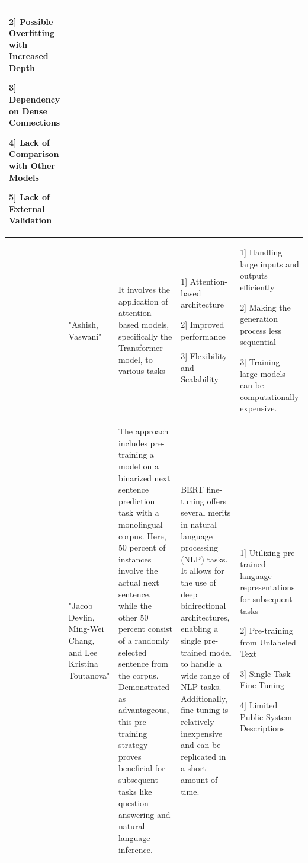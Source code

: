 \documentclass[fleqn,10pt]{thescipub} %
\begin{document}
\begin{table}
\begin{center}
\begin{tabular}{ |p{1cm}|p{2cm}|p{4cm}|p{4cm}|p{4cm}| }
2] Possible Overfitting with Increased Depth

3] Dependency on Dense Connections

4] Lack of Comparison with Other Models

5] Lack of External Validation \\
\hline
[21]  & "Ashish, Vaswani" & It involves the application of attention-based models, specifically the Transformer model, to various tasks & 1] Attention-based architecture

2]  Improved performance

3] Flexibility and Scalability 
 & 1] Handling large inputs and outputs efficiently

2] Making the generation process less sequential

3] Training large models can be computationally expensive. \\
\hline
[23] & "Jacob Devlin, Ming-Wei Chang, and Lee Kristina Toutanova" & The approach includes pre-training a model on a binarized next sentence prediction task with a monolingual corpus. Here, 50 percent of instances involve the actual next sentence, while the other 50 percent consist of a randomly selected sentence from the corpus. Demonstrated as advantageous, this pre-training strategy proves beneficial for subsequent tasks like question answering and natural language inference.& BERT fine-tuning offers several merits in natural language processing (NLP) tasks. It allows for the use of deep bidirectional architectures, enabling a single pre-trained model to handle a wide range of NLP tasks. Additionally, fine-tuning is relatively inexpensive and can be replicated in a short amount of time. & 1] Utilizing pre-trained language representations for subsequent tasks

2] Pre-training from Unlabeled Text

3] Single-Task Fine-Tuning

4]  Limited Public System Descriptions
 \\
\hline

\end{tabular}
\end{center}
\end{table}
\end{document}
